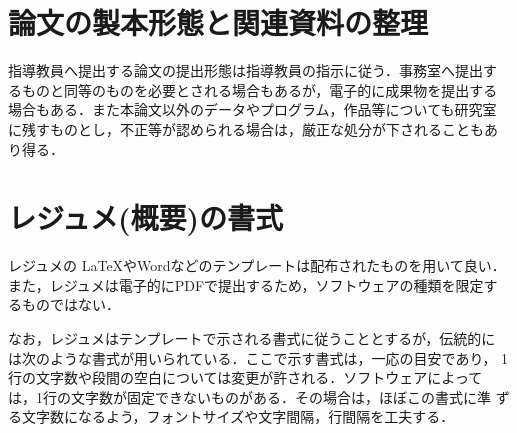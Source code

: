 \section{論文の製本形態と関連資料の整理}
\label{sec:style}

指導教員へ提出する論文の提出形態は指導教員の指示に従う．事務室へ提出す
るものと同等のものを必要とされる場合もあるが，電子的に成果物を提出する
場合もある．また本論文以外のデータやプログラム，作品等についても研究室
に残すものとし，不正等が認められる場合は，厳正な処分が下されることもあ
り得る．
 
\section{レジュメ(概要)の書式}
\label{sec:format_abst}

レジュメの \LaTeX やWordなどのテンプレートは配布されたものを用いて良い．
また，レジュメは電子的にPDFで提出するため，ソフトウェアの種類を限定す
るものではない．

なお，レジュメはテンプレートで示される書式に従うこととするが，伝統的に
は次のような書式が用いられている．ここで示す書式は，一応の目安であり，
1行の文字数や段間の空白については変更が許される．ソフトウェアによって
は，1行の文字数が固定できないものがある．その場合は，ほぼこの書式に準
ずる文字数になるよう，フォントサイズや文字間隔，行間隔を工夫する．

